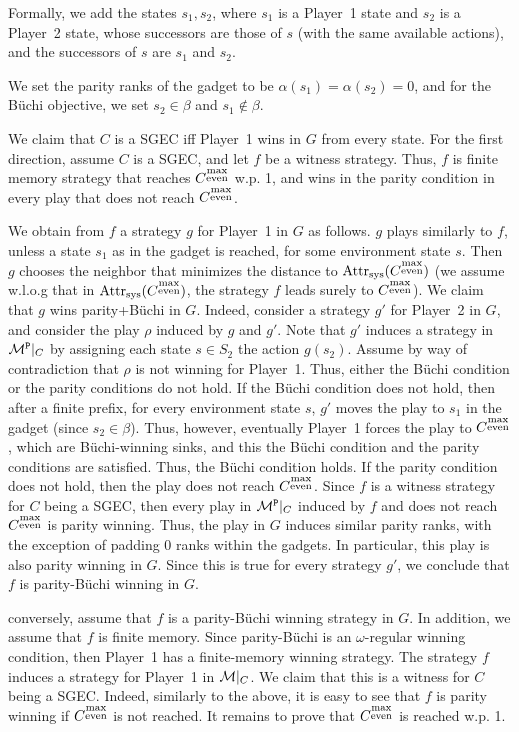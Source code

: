 \documentclass[runningheads,a4paper]{llncs}
\newcommand{\M}{{\cal M}}
\renewcommand{\P}{{\mathtt P}}
\newcommand{\buchi}{B\"uchi\xspace}
\newcommand{\sgec}{{SGEC}\xspace}
\newcommand{\attr}{{\rm Attr}}
\newcommand{\sys}{{\rm sys}}
\newcommand{\me}{{\substack{\rm max\\ \rm even}}}
\begin{document}
Formally, we add the states $s_1,s_{2}$, where $s_1$ is a Player~1 state and $s_{2}$ is a Player~2 state, whose successors are those of $s$ (with the same available actions), and the successors of $s$ are $s_1$ and $s_{2}$.

We set the parity ranks of the gadget to be $\alpha(s_1)=\alpha(s_{2})=0$, and for the \buchi objective, we set $s_2\in \beta$ and $s_1\notin \beta$.

We claim that $C$ is a \sgec iff Player~1 wins in $G$ from every state. For the first direction, assume $C$ is a \sgec, and let $f$ be a witness strategy. Thus, $f$ is finite memory strategy that reaches $C^{\me}$ w.p. 1, and wins in the parity condition in every play that does not reach $C^{\me}$.

We obtain from $f$ a strategy $g$ for Player~1 in $G$ as follows. $g$ plays similarly to $f$, unless a state $s_1$ as in the gadget  is reached, for some environment state $s$. Then $g$ chooses the neighbor that minimizes the distance to $\attr_\sys(C^{\me})$ (we assume w.l.o.g that in $\attr_\sys(C^{\me})$, the strategy $f$ leads surely to $C^{\me}$). We claim that $g$ wins parity+\buchi in $G$. Indeed, consider a strategy $g'$ for Player~2 in $G$, and consider the play $\rho$ induced by $g$ and $g'$. Note that $g'$ induces a strategy in $\M^\P|_C$ by assigning each state $s\in S_2$ the action $g(s_2)$.
Assume by way of contradiction that $\rho$ is not winning for Player~1. Thus, either the \buchi condition or the parity conditions do not hold. If the \buchi condition does not hold, then after a finite prefix, for every environment state $s$, $g'$ moves the play to $s_1$ in the gadget (since $s_2\in \beta$). Thus, however, eventually Player~1 forces the play to $C^{\me}$, which are \buchi-winning sinks, and this the \buchi condition and the parity conditions are satisfied. Thus, the \buchi condition holds. If the parity condition does not hold, then the play does not reach $C^{\me}$. Since $f$ is a witness strategy for $C$ being a \sgec, then every play in $\M^\P|_C$ induced by $f$ and does not reach $C^{\me}$ is parity winning. Thus, the play in $G$ induces similar parity ranks, with the exception of padding $0$ ranks within the gadgets. In particular, this play is also parity winning in $G$. Since this is true for every strategy $g'$, we conclude that $f$ is parity-\buchi winning in $G$.

conversely, assume that $f$ is a parity-\buchi winning strategy in $G$. In addition, we assume that $f$ is finite memory. Since parity-\buchi is an $\omega$-regular winning condition, then Player~1 has a finite-memory winning strategy. The strategy $f$ induces a strategy for Player~1 in $\M|_C$. We claim that this is a witness for $C$ being a \sgec.
Indeed, similarly to the above, it is easy to see that $f$ is parity winning if $C^{\me}$ is not reached. It remains to prove that $C^{\me}$ is reached w.p. 1. 
\end{document}
